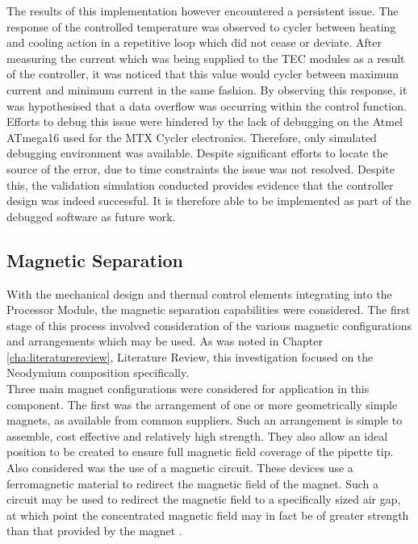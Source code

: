 The results of this implementation however encountered a persistent issue. The response of the controlled temperature was observed to cycler between heating and cooling action in a repetitive loop which did not cease or deviate. After measuring the current which was being supplied to the TEC modules as a result of the controller, it was noticed that this value would cycler between maximum current and minimum current in the same fashion. By observing this response, it was hypothesised that a data overflow was occurring within the control function. Efforts to debug this issue were hindered by the lack of debugging on the Atmel ATmega16 used for the MTX Cycler electronics. Therefore, only  simulated debugging environment was available. Despite significant efforts to locate the source of the error, due to time constraints the issue was not resolved. Despite this, the validation simulation conducted provides evidence that the controller design was indeed successful. It is therefore able to be implemented as part of the debugged software as future work.

\subsection{Magnetic Separation}

With the mechanical design and thermal control elements integrating into the Processor Module, the magnetic separation capabilities were considered. The first stage of this process involved consideration of the various magnetic configurations and arrangements which may be used. As was noted in Chapter \ref{cha:literaturereview}, Literature Review, this investigation focused on the Neodymium composition specifically.\\

Three main magnet configurations were considered for application in this component. The first was the arrangement of one or more geometrically simple magnets, as available from common suppliers. Such an arrangement is simple to assemble, cost effective and relatively high strength. They also allow an ideal position to be created to ensure full magnetic field coverage of the pipette tip.\\

Also considered was the use of a magnetic circuit. These devices use a ferromagnetic material to redirect the magnetic field of the magnet. Such a circuit may be used to redirect the magnetic field to a specifically sized air gap, at which point the concentrated magnetic field may in fact be of greater strength than that provided by the magnet \cite{magcirc}.\\

